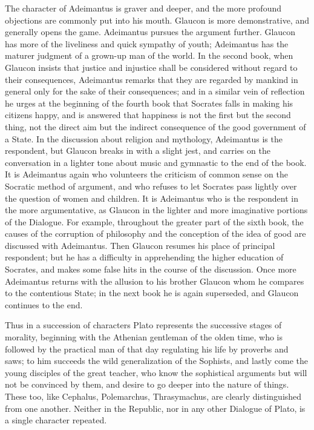 The character of Adeimantus is graver and deeper, and the more profound objections are commonly put into his mouth. Glaucon is more demonstrative, and generally opens the game. Adeimantus pursues the argument further. Glaucon has more of the liveliness and quick sympathy of youth; Adeimantus has the maturer judgment of a grown-up man of the world. In the second book, when Glaucon insists that justice and injustice shall be considered without regard to their consequences, Adeimantus remarks that they are regarded by mankind in general only for the sake of their consequences; and in a similar vein of reflection he urges at the beginning of the fourth book that Socrates falls in making his citizens happy, and is answered that happiness is not the first but the second thing, not the direct aim but the indirect consequence of the good government of a State. In the discussion about religion and mythology, Adeimantus is the respondent, but Glaucon breaks in with a slight jest, and carries on the conversation in a lighter tone about music and gymnastic to the end of the book. It is Adeimantus again who volunteers the criticism of common sense on the Socratic method of argument, and who refuses to let Socrates pass lightly over the question of women and children. It is Adeimantus who is the respondent in the more argumentative, as Glaucon in the lighter and more imaginative portions of the Dialogue. For example, throughout the greater part of the sixth book, the causes of the corruption of philosophy and the conception of the idea of good are discussed with Adeimantus. Then Glaucon resumes his place of principal respondent; but he has a difficulty in apprehending the higher education of Socrates, and makes some false hits in the course of the discussion. Once more Adeimantus returns with the allusion to his brother Glaucon whom he compares to the contentious State; in the next book he is again superseded, and Glaucon continues to the end.

Thus in a succession of characters Plato represents the successive stages of morality, beginning with the Athenian gentleman of the olden time, who is followed by the practical man of that day regulating his life by proverbs and saws; to him succeeds the wild generalization of the Sophists, and lastly come the young disciples of the great teacher, who know the sophistical arguments but will not be convinced by them, and desire to go deeper into the nature of things. These too, like Cephalus, Polemarchus, Thrasymachus, are clearly distinguished from one another. Neither in the Republic, nor in any other Dialogue of Plato, is a single character repeated.


